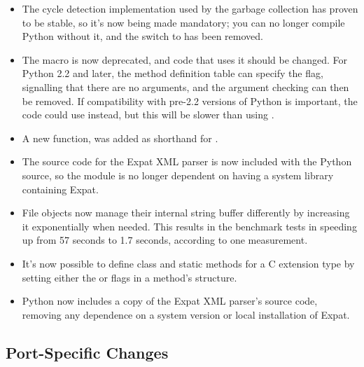 \documentclass{howto}
\begin{document}
\begin{itemize}
\item The cycle detection implementation used by the garbage collection
has proven to be stable, so it's now being made mandatory; you can no
longer compile Python without it, and the
 switch to  has been removed.

\item The  macro is now deprecated, and code
that uses it should be changed.  For Python 2.2 and later, the method
definition table can specify the
 flag, signalling that there are no arguments, and 
the argument checking can then be removed.  If compatibility with
pre-2.2 versions of Python is important, the code could use
 instead, but this will be slower 
than using .

\item A new function,  was added
as shorthand for 
.

\item The source code for the Expat XML parser is now included with
the Python source, so the  module is no longer
dependent on having a system library containing Expat.

\item File objects now manage their internal string buffer
differently by increasing it exponentially when needed.  
This results in the benchmark tests in  
speeding up from 57 seconds to 1.7 seconds, according to one
measurement.

\item It's now possible to define class and static methods for a C
extension type by setting either the  or
 flags in a method's 
structure.

\item Python now includes a copy of the Expat XML parser's source code,
removing any dependence on a system version or local installation of
Expat.  

\end{itemize}

\subsection{Port-Specific Changes}
\end{document}
